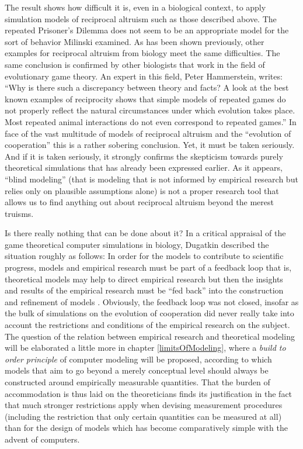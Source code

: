 The result shows how difficult it is, even in a biological context, to apply
simulation models of reciprocal altruism such as those described above. 
The repeated Prisoner's Dilemma does not seem to be an
appropriate model for the sort of behavior Milinski examined. As has been
shown previously, other examples for reciprocal altruism from biology meet the
same difficulties.  The same conclusion is confirmed by other biologists that
work in the field of evolutionary game theory. An expert in this field, Peter
Hammerstein, writes: ``Why is there such a discrepancy between theory and
facts? A look at the best known examples of reciprocity shows that simple
models of repeated games do not properly reflect the natural circumstances
under which evolution takes place. Most repeated animal interactions do not
even correspond to repeated games.'' \cite[p.\ 83]{hammerstein:2003} In face of
the vast multitude of models of reciprocal altruism and the ``evolution of
cooperation'' this is a rather sobering conclusion.  Yet, it must be taken
seriously. And if it is taken seriously, it strongly confirms the skepticism
towards purely theoretical simulations that has already been expressed
earlier. As it appears, ``blind modeling'' (that is modeling that is not
informed by empirical research but relies only on plausible assumptions alone)
is not a proper research tool that allows us to find anything out about
reciprocal altruism beyond the merest truisms.

Is there really nothing that can be done about it? In a critical appraisal of
the game theoretical computer simulations in biology, Dugatkin described the
situation roughly as follows: In order for the models to contribute to
scientific progress, models and empirical research must be part of a feedback
loop that is, theoretical models may help to direct empirical research but
then the insights and results of the empirical research must be ``fed back''
into the construction and refinement of models \cite[p.\ 54ff.]{dugatkin:1998}.
Obviously, the feedback loop was not closed, insofar as the bulk of
simulations on the evolution of cooperation did never really take into account
the restrictions and conditions of the empirical research on the subject. The
question of the relation between empirical research and theoretical modeling
will be elaborated a little more in chapter \ref{limitsOfModeling}, where a
{\em build to order principle} of computer modeling will be proposed, according
to which models that aim to go beyond a merely conceptual level should always
be constructed around empirically measurable quantities. That the burden of
accommodation is thus laid on the theoreticians finds its justification in the
fact that much stronger restrictions apply when devising measurement
procedures (including the restriction that only certain quantities can be
measured at all) than for the design of models which has become comparatively
simple with the advent of computers.


